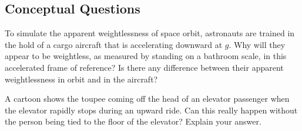 \documentclass[
]{book}
\newenvironment{conceptual-questions}{}{}
\begin{document}
\hypertarget{fs-id1549126}{}
\begin{conceptual-questions}

\hypertarget{conceptual-questions-16}{%
\subsection{Conceptual Questions}\label{conceptual-questions-16}}

\hypertarget{fs-id3109644}{}
\leavevmode\hypertarget{fs-id3109646}{}%
To simulate the apparent weightlessness of space orbit, astronauts are
trained in the hold of a cargo aircraft that is accelerating downward at
\(g{}\). Why will they appear to be weightless, as measured by standing on
a bathroom scale, in this accelerated frame of reference? Is there any
difference between their apparent weightlessness in orbit and in the
aircraft?

\hypertarget{fs-id1449853}{}
\leavevmode\hypertarget{fs-id3256198}{}%
A cartoon shows the toupee coming off the head of an elevator passenger
when the elevator rapidly stops during an upward ride. Can this really
happen without the person being tied to the floor of the elevator?
Explain your answer.

\end{conceptual-questions}
\end{document}
